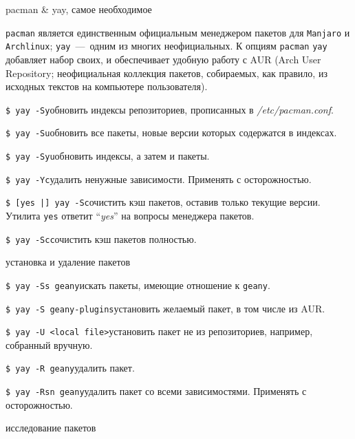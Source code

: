 \documentclass[
a4paper
,11pt
,landscape
,russian
,twocolumn
]{letter}
\newcommand\hsp{\hspace{.2in}}
\newcommand\vsp{\vspace{.2in}}
\begin{document}
\thispagestyle{empty}

\begin{Large}
    pacman \& yay, самое необходимое
\end{Large}

\vsp

\texttt{pacman} является единственным официальным менеджером пакетов для
\texttt{Manjaro} и \texttt{Archlinux}; \texttt{yay}~---~одним из многих
неофициальных.
К опциям \texttt{pacman} \texttt{yay} добавляет набор своих, и обеспечивает
удобную работу с AUR (Arch User Repository; неофициальная коллекция пакетов,
собираемых, как правило, из исходных текстов на компьютере пользователя).

\texttt{\$ yay -Sy}\hsp обновить индексы репозиториев, прописанных в
\textit{/etc/pacman.conf}.

\texttt{\$ yay -Su}\hsp обновить все пакеты, новые версии которых
содержатся в индексах.

\texttt{\$ yay -Syu}\hsp обновить индексы, а затем и пакеты.

\texttt{\$ yay -Yc}\hsp удалить ненужные зависимости. Применять
с осторожностью.

\texttt{\$ [yes |] yay -Sc}\hsp очистить кэш пакетов, оставив только
текущие версии. Утилита \texttt{yes} ответит ``\textit{yes}'' на вопросы
менеджера пакетов.

\texttt{\$ yay -Scc}\hsp очистить кэш пакетов полностью.

\vsp

\begin{Large}
установка и удаление пакетов
\end{Large}

\vsp

\texttt{\$ yay -Ss geany}\hsp искать пакеты, имеющие отношение к
\texttt{geany}.

\texttt{\$ yay -S geany-plugins}\hsp установить желаемый пакет, в том
числе из AUR.

\texttt{\$ yay -U <local file>}\hsp установить пакет не из репозиториев,
например, собранный вручную.

\texttt{\$ yay -R geany}\hsp удалить пакет.

\texttt{\$ yay -Rsn geany}\hsp удалить пакет со всеми зависимостями.
Применять с осторожностью.

\vsp

\begin{Large}
исследование пакетов
\end{Large}
\end{document}
